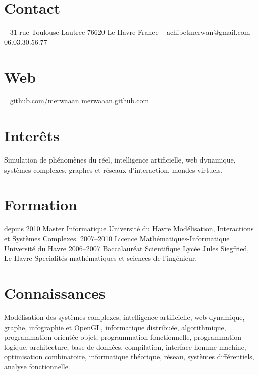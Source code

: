 \documentclass[]{friggeri-cv}
\begin{document}
       {}

\begin{aside}
  \section{Contact}
    ~
    31 rue Toulouse Lautrec
    76620 Le Havre
    France
    ~
    achibetmerwan{}@gmail.com
    ~
    06.03.30.56.77
    \section{Web}
    ~
    \href{http://github.com/merwaaan}{github.com/merwaaan}
    \href{http://merwaaan.github.com}{merwaaan.github.com}
\end{aside}

\section{Interêts}

Simulation de phénomènes du réel, intelligence artificielle, web
dynamique, systèmes complexes, graphes et réseaux d'interaction,
mondes virtuels.

\section{Formation}

\begin{entrylist}
  \entry
    {depuis 2010}
    {Master Informatique}
    {Université du Havre}
    {Modélisation, Interactions et Systèmes Complexes.}
  \entry
    {2007–2010}
    {Licence Mathématiques-Informatique}
    {Université du Havre}
    {}
  \entry
    {2006–2007}
    {Baccalauréat Scientifique}
    {Lycée Jules Siegfried, Le Havre}
    {Specialités mathématiques et sciences de l'ingénieur.}
\end{entrylist}

\section{Connaissances}

Modélisation des systèmes complexes, intelligence artificielle, web
dynamique, graphe, infographie et OpenGL, informatique distribuée,
algorithmique, programmation orientée objet, programmation
fonctionnelle, programmation logique, architecture, base de données,
compilation, interface homme-machine, optimisation combinatoire,
informatique théorique, réseau, systèmes différentiels, analyse
fonctionnelle.
\end{document}
